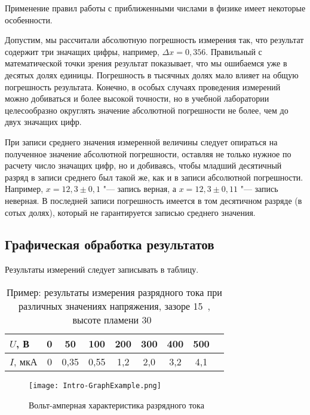 \documentclass[a4paper, 12pt]{extarticle}
\begin{document}
Применение правил работы с приближенными числами в физике имеет некоторые особенности.

Допустим, мы рассчитали абсолютную погрешность измерения так, что результат содержит три значащих цифры, например, $\Delta x = 0,356$. Правильный с математической точки зрения результат показывает, что мы ошибаемся уже в десятых долях единицы. Погрешность в тысячных долях мало влияет на общую погрешность результата. Конечно, в особых случаях проведения измерений можно добиваться и более высокой точности, но в учебной лаборатории целесообразно округлять значение абсолютной погрешности не более, чем до двух значащих цифр.

При записи среднего значения измеренной величины следует опираться на полученное значение абсолютной погрешности, оставляя не только нужное по расчету число значащих цифр, но и добиваясь, чтобы младший десятичный разряд в записи среднего был такой же, как и в записи абсолютной погрешности. Например, $x = 12,3 \pm 0,1$ "--- запись верная, а $x = 12,3 \pm 0,11$ "--- запись неверная. В последней записи погрешность имеется в том десятичном разряде (в сотых долях), который не гарантируется записью среднего значения.

\subsection{Графическая обработка результатов}

Результаты измерений следует записывать в таблицу.

\begin{table}[b]
\caption{Пример: результаты измерения разрядного тока при различных значениях напряжения, зазоре 15~, высоте пламени 30~ \label{tab:example-exp}}
\begin{center}
\begin{tabular}{|l|c|c|c|c|c|c|c|c|}
\hline
$U$, В   & 0 & 50   & 100  & 200 & 300 & 400 & 500 \\ \hline
$I$, мкА & 0 & 0,35 & 0,55 & 1,2 & 2,0 & 3,2 & 4,1 \\ \hline
\end{tabular}
\end{center}
\end{table}

\begin{figure}[t]
\begin{center}
\texttt{[image: Intro-GraphExample.png]}
\end{center}
\caption{Вольт-амперная характеристика разрядного тока \label{fig:example-exp-plot}}
\end{figure}
\end{document}
